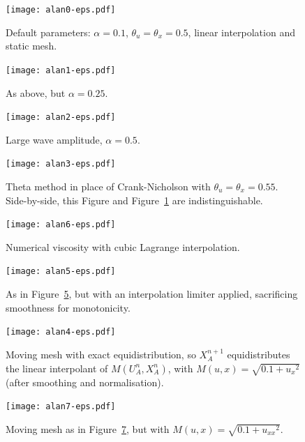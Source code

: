 \documentclass{article}
\begin{document}
\begin{figure}[htbp]
\centering
  \texttt{[image: alan0-eps.pdf]}
  \caption{Default parameters: $\alpha = 0.1$, $\theta_u = \theta_x = 0.5$,
  linear interpolation and static mesh.
  \label{fig:alan0-eps}}
\end{figure}
\begin{figure}[hbtp]
\centering
  \texttt{[image: alan1-eps.pdf]}
  \caption{As above, but $\alpha = 0.25$.
  \label{fig:alan1-eps}}
\end{figure}
\begin{figure}[htbp]
\centering
  \texttt{[image: alan2-eps.pdf]}
  \caption{Large wave amplitude, $\alpha = 0.5$.
  \label{fig:alan2-eps}}
\end{figure}
\begin{figure}[hbtp]
\centering
  \texttt{[image: alan3-eps.pdf]}
  \caption{Theta method in place of Crank-Nicholson with $\theta_u = \theta_x = 0.55$.
    Side-by-side, this Figure and Figure~\ref{fig:alan0-eps} are indistinguishable.
  \label{fig:alan3-eps}}
\end{figure}
\begin{figure}[htbp]
\centering
  \texttt{[image: alan6-eps.pdf]}
  \caption{Numerical viscosity with cubic Lagrange interpolation.
  \label{fig:alan6-eps}}
\end{figure}
\begin{figure}[hbtp]
\centering
  \texttt{[image: alan5-eps.pdf]}
  \caption{As in Figure~\ref{fig:alan6-eps}, but with an interpolation limiter
  applied, sacrificing smoothness for monotonicity.
  \label{fig:alan5-eps}}
\end{figure}
\begin{figure}[htbp]
\centering
  \texttt{[image: alan4-eps.pdf]}
  \caption{Moving mesh with exact equidistribution, so $X_A^{n+1}$
    equidistributes the linear interpolant of $M(U^n_A,X^n_A)$, with
    $M(u,x) = \sqrt{0.1 + {u_x}^2}$ (after smoothing and normalisation).
  \label{fig:alan4-eps}}
\end{figure}
\begin{figure}[hbtp]
\centering
  \texttt{[image: alan7-eps.pdf]}
  \caption{Moving mesh as in Figure~\ref{fig:alan4-eps}, but with
  $M(u,x) = \sqrt{0.1 + {u_{xx}}^2}$.
  \label{fig:alan7-eps}}
\end{figure}
\end{document}
